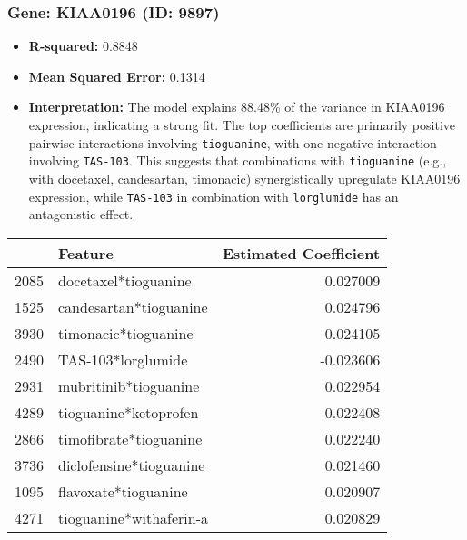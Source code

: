 \documentclass[12pt]{article}
\begin{document}
\subsubsection{Gene: KIAA0196 (ID: 9897)}
\begin{itemize}
    \item \textbf{R-squared:} 0.8848
    \item \textbf{Mean Squared Error:} 0.1314
    \item \textbf{Interpretation:} The model explains 88.48\% of the variance in KIAA0196 expression, indicating a strong fit. The top coefficients are primarily positive pairwise interactions involving \texttt{tioguanine}, with one negative interaction involving \texttt{TAS-103}. This suggests that combinations with \texttt{tioguanine} (e.g., with docetaxel, candesartan, timonacic) synergistically upregulate KIAA0196 expression, while \texttt{TAS-103} in combination with \texttt{lorglumide} has an antagonistic effect.
\end{itemize}
\begin{tabularx}{\textwidth}{l X r}
\toprule
{} & Feature & Estimated Coefficient \\
\midrule
2085 & docetaxel*tioguanine & 0.027009 \\
1525 & candesartan*tioguanine & 0.024796 \\
3930 & timonacic*tioguanine & 0.024105 \\
2490 & TAS-103*lorglumide & -0.023606 \\
2931 & mubritinib*tioguanine & 0.022954 \\
4289 & tioguanine*ketoprofen & 0.022408 \\
2866 & timofibrate*tioguanine & 0.022240 \\
3736 & diclofensine*tioguanine & 0.021460 \\
1095 & flavoxate*tioguanine & 0.020907 \\
4271 & tioguanine*withaferin-a & 0.020829 \\
\bottomrule
\end{tabularx}
\end{document}
